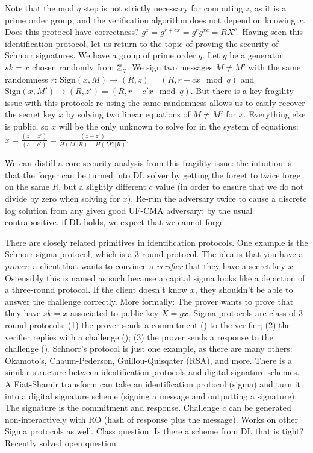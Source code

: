 Note that the mod $q$ step is not strictly necessary for computing $z$, as it is a prime order group, 
and the verification algorithm does not depend on knowing $x$. 
Does this protocol have correctness? 
$g^z = g^{r + cx} = g^rg^{xc} = RX^c$. Having seen this identification protocol, let us return to the topic of proving the security of Schnorr signatures. 
We have a group of prime order $q$. Let $g$ be a generator $sk = x$ chosen randomly from ${{\mathbb Z}}_q$. We sign two messages $M\neq M'$ with the same randomness $r$: $\text{Sign}(x,M)\rightarrow(R,z) = (R, r+cx \mod q)$ and $\text{Sign}(x,M')\rightarrow(R,z') = (R, r+c'x \mod q)$. But there is a key fragility issue with this protocol: re-using the same randomness allows us to easily recover the secret key $x$ by solving two linear equations of $M\neq M'$ for $x$. Everything else is public, so $x$ will be the only unknown to solve for in the system of equations:
$x = \frac{(z=z')}{(c-c')}=\frac{(z-z')}{H(M||R)-H(M'||R)}$.

We can distill a core security analysis from this fragility issue: the intuition is that the forger can be turned into DL solver by getting the forget to twice forge on the same $R$, but a slightly different $c$ value (in order to ensure that we do not divide by zero when solving for $x$). Re-run the adversary twice to cause a discrete log solution from any given good UF-CMA adversary; by the usual contrapositive, if DL holds, we expect that we cannot forge.

There are closely related primitives in identification protocols. One example is the Schnorr sigma protocol, which is a 3-round protocol. The idea is that you have a \emph{prover}, a client that wants to convince a \emph{verifier} that they have a secret key $x$. Ostensibly this is named as such because a capital sigma looks like a depiction of a three-round protocol. If the client doesn't know $x$, they shouldn't be able to answer the challenge correctly.
More formally:
The prover wants to prove that they have $sk = x$ associated to public key $X = gx$. Sigma protocols are class of 3-round protocols: (1) the prover sends a commitment (\IDcom) to the verifier; (2) the verifier replies with a challenge (\IDver); (3) the prover sends a response to the challenge (\IDresp). Schnorr's protocol is just one example, as there are many others: Okamoto's, Chaum-Pederson, Guillou-Quisqater (RSA), and more.
There is a similar structure between identification protocols and digital signature schemes. A Fiat-Shamir transform can take an identification protocol (sigma) and turn it into a digital signature scheme (signing a message and outputting a signature): The signature is the commitment and response. Challenge $c$ can be generated non-interactively with RO (hash of response plus the message). Works on other Sigma protocols as well. Class question:
Is there a scheme from DL that is tight?
Recently solved open question. 

